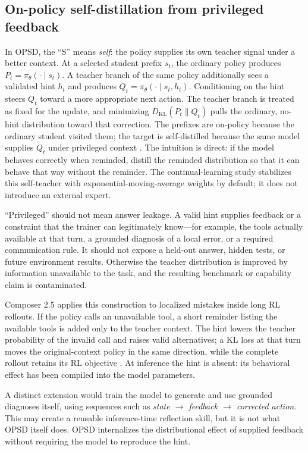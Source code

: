 \subsection{On-policy self-distillation from privileged feedback}

In OPSD, the ``S'' means \emph{self}: the policy supplies its own teacher signal under a
better context. At a selected student prefix $s_t$, the ordinary policy produces
$P_t=\pi_\theta(\cdot\mid s_t)$. A teacher branch of the same policy additionally sees a
validated hint $h_t$ and produces $Q_t=\pi_\theta(\cdot\mid s_t,h_t)$. Conditioning
on the hint steers $Q_t$ toward a more appropriate next action. The teacher branch is
treated as fixed for the update, and minimizing $D_{\mathrm{KL}}(P_t\|Q_t)$ pulls the
ordinary, no-hint distribution toward that correction. The prefixes are on-policy because
the ordinary student visited them; the target is self-distilled because the same model
supplies $Q_t$ under privileged context
\citep{shenfeld2026selfdistillation,cursor2026composer25}.
The intuition is direct: if the model behaves correctly when reminded, distill the
reminded distribution so that it can behave that way without the reminder. The
continual-learning study stabilizes this self-teacher with exponential-moving-average
weights by default; it does not introduce an external expert.

``Privileged'' should not mean answer leakage. A valid hint supplies feedback or a
constraint that the trainer can legitimately know---for example, the tools actually
available at that turn, a grounded diagnosis of a local error, or a required communication
rule. It should not expose a held-out answer, hidden tests, or future environment results.
Otherwise the teacher distribution is improved by information unavailable to the task,
and the resulting benchmark or capability claim is contaminated.

Composer 2.5 applies this construction to localized mistakes inside long RL rollouts. If
the policy calls an unavailable tool, a short reminder listing the available tools is added
only to the teacher context. The hint lowers the teacher probability of the invalid call
and raises valid alternatives; a KL loss at that turn moves the original-context policy in
the same direction, while the complete rollout retains its RL objective
\citep{cursor2026composer25}. At inference the hint is absent: its behavioral effect has
been compiled into the model parameters.

A distinct extension would train the model to generate and use grounded diagnoses itself,
using sequences such as \emph{state $\rightarrow$ feedback $\rightarrow$ corrected
action}. This may create a reusable inference-time reflection skill, but it is not what
OPSD itself does. OPSD internalizes the distributional effect of supplied feedback without
requiring the model to reproduce the hint.
